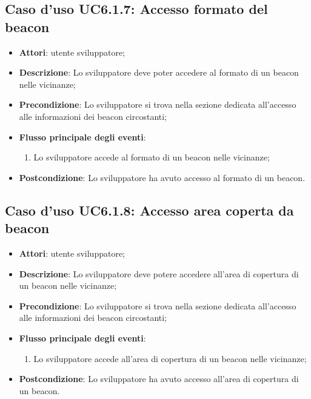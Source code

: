 \documentclass[../AnalisiDeiRequisiti.tex]{subfiles}
\begin{document}
\subsection{Caso d'uso UC6.1.7: Accesso formato del beacon}

\begin{itemize}
\item \textbf{Attori}: utente sviluppatore;
\item \textbf{Descrizione}: Lo sviluppatore deve poter accedere al formato di un beacon nelle vicinanze; 
      \item \textbf{Precondizione}: Lo sviluppatore si trova nella sezione dedicata all'accesso alle informazioni dei beacon circostanti;

        \item \textbf{Flusso principale degli eventi}:
          \begin{enumerate}
          \item Lo sviluppatore accede al formato di un beacon nelle vicinanze;

      \end{enumerate}
    \item \textbf{Postcondizione}: Lo sviluppatore ha avuto accesso al formato di un beacon.
  \end{itemize}
\hypertarget{UC6.1.8}{}
\subsection{Caso d'uso UC6.1.8: Accesso area coperta da beacon}
\begin{itemize}
\item \textbf{Attori}: utente sviluppatore;
\item \textbf{Descrizione}: Lo sviluppatore deve potere accedere all’area di copertura di un beacon nelle vicinanze; 
      \item \textbf{Precondizione}: Lo sviluppatore si trova nella sezione dedicata all'accesso alle informazioni dei beacon circostanti;

        \item \textbf{Flusso principale degli eventi}:
          \begin{enumerate}
          \item Lo sviluppatore accede all’area di copertura di un beacon nelle vicinanze;

      \end{enumerate}
    \item \textbf{Postcondizione}: Lo sviluppatore ha avuto accesso all’area di copertura di un beacon.
  \end{itemize}
\hypertarget{UC6.2}{}
\end{document}
